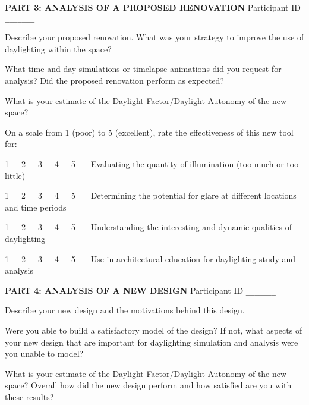 \documentclass[12pt]{article}
\begin{document}
\newpage

{\bf PART 3: ANALYSIS OF A PROPOSED RENOVATION } \hfill Participant ID
\verb+_______+
\vspace{0.2in}

Describe your proposed renovation.  What was your strategy to improve
the use of daylighting within the space?
\vspace{1.7in}


What time and day simulations or timelapse animations did you request
for analysis?  Did the proposed renovation perform as expected?
\vspace{1.7in}



What is your estimate of the Daylight Factor/Daylight Autonomy of the
new space?
\vspace{1.7in}


On a scale from 1 (poor) to 5 (excellent), rate the effectiveness of
this new tool for:

1~~~2~~~3~~~4~~~5~~~ Evaluating the quantity of illumination (too much or too little)

1~~~2~~~3~~~4~~~5~~~ Determining the potential for glare at different locations and time periods

1~~~2~~~3~~~4~~~5~~~ Understanding the interesting and dynamic qualities of daylighting

1~~~2~~~3~~~4~~~5~~~ Use in architectural education for daylighting study and analysis



\newpage

{\bf PART 4: ANALYSIS OF A NEW DESIGN }
\hfill Participant ID \verb+_______+
\vspace{0.2in}


Describe your new design and the motivations behind this design.  
\vspace{1.7in}


Were you able to build a satisfactory model of the design?  If not,
what aspects of your new design that are important for daylighting
simulation and analysis were you unable to model?  
\vspace{1.7in}



What is your estimate of the Daylight Factor/Daylight Autonomy of the
new space?  Overall how did the new design perform and how satisfied
are you with these results?
\vspace{1.7in}
\end{document}
